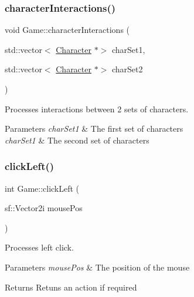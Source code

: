\subsubsection{\texorpdfstring{character\+Interactions()}{characterInteractions()}}
{\footnotesize\ttfamily void Game\+::character\+Interactions (\begin{DoxyParamCaption}\item[{std\+::vector$<$ \hyperlink{class_character}{Character} $\ast$$>$}]{char\+Set1,  }\item[{std\+::vector$<$ \hyperlink{class_character}{Character} $\ast$$>$}]{char\+Set2 }\end{DoxyParamCaption})}



Processes interactions between 2 sets of characters. 


\begin{DoxyParams}{Parameters}
{\em char\+Set1} & The first set of characters \\
\hline
{\em char\+Set1} & The second set of characters \\
\hline
\end{DoxyParams}
\mbox{\label{class_game_a70f8b3b5e70a9b768c79e453a3c72642}} 
\subsubsection{\texorpdfstring{click\+Left()}{clickLeft()}}
{\footnotesize\ttfamily int Game\+::click\+Left (\begin{DoxyParamCaption}\item[{sf\+::\+Vector2i}]{mouse\+Pos }\end{DoxyParamCaption})}



Processes left click. 


\begin{DoxyParams}{Parameters}
{\em mouse\+Pos} & The position of the mouse \\
\hline
\end{DoxyParams}
\begin{DoxyReturn}{Returns}
Retuns an action if required 
\end{DoxyReturn}
\mbox{\label{class_game_a716af68f70fa3a749663f135940bfa51}} 
